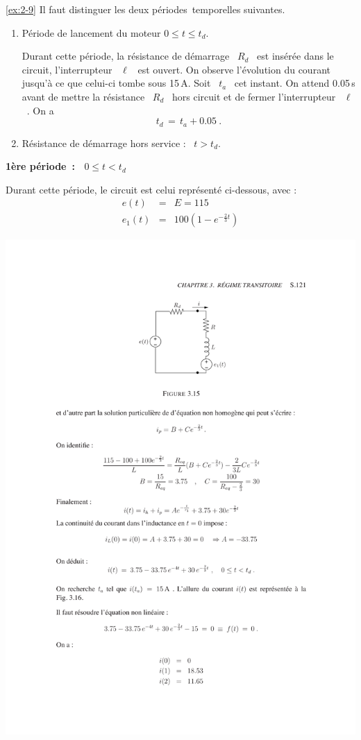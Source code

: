 \begin{solexercise}{\ref{ex:2-9}}
	\label{solex:2-9}
Il faut distinguer les deux p\'eriodes~temporelles suivantes. 
\begin{enumerate}
	\item P\'eriode de lancement du moteur \: $0\leq t \leq t_d$.
	
	Durant cette p\'eriode, la r\'esistance de d\'emarrage \ $R_d$ \ est
	ins\'er\'ee dans le circuit, l'interrupteur \ $\ell$ \ est ouvert.  On
	observe l'\'evolution du courant jusqu'\`a ce que celui-ci tombe sous
	15$\,$A. Soit \ $t_a$ \ cet instant. On attend 0.05$\,$s avant de
	mettre la r\'esistance \ $R_d$ \ hors circuit et de fermer
	l'interrupteur \ $\ell$~. On a
	\[ t_d \, = \, t_a + 0.05~. \]           
	\item R\'esistance de d\'emarrage hors service : \ $t>t_d$.
\end{enumerate}
\vspace*{1ex}

{\bf 1\`ere p\'eriode~: \ $0\leq t < t_d$} 

Durant cette p\'eriode, le circuit est celui repr\'esent\'e ci-dessous, avec :
\begin{eqnarray*}
	e(t) &=&E = 115 \\
	e_1(t) &=& 100(1-e^{-\frac{2}{3}t}) 
\end{eqnarray*}
\begin{center}
	\includegraphics[width=\linewidth]{sol_exercices/ex3-9-1}
\end{center}


\end{solexercise}
